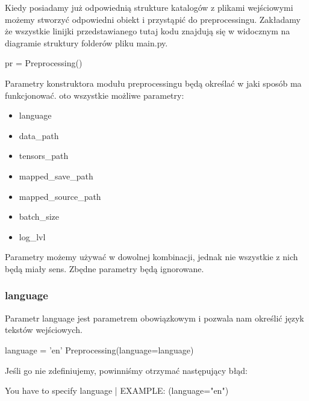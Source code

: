 \myspace
{}
\myspace

Kiedy posiadamy już odpowiednią strukture katalogów z plikami wejściowymi możemy stworzyć 
odpowiedni obiekt i przystąpić do preprocessingu. Zakładamy że wszystkie linijki przedstawianego 
tutaj kodu znajdują się w widocznym na diagramie struktury folderów pliku main.py.

\begin{python}
pr = Preprocessing()

\end{python}

Parametry konstruktora modułu preprocessingu będą określać w jaki sposób ma funkcjonować. 
oto wszystkie możliwe parametry:
\begin{itemize}
	\item language
	\item data\_path
	\item tensors\_path
	\item mapped\_save\_path
	\item mapped\_source\_path
	\item batch\_size
	\item log\_lvl
\end{itemize}

Parametry możemy używać w dowolnej kombinacji, jednak nie wszystkie z nich będą miały sens. Zbędne
parametry będą ignorowane.

\subsubsection{language}
Parametr language jest parametrem obowiązkowym i pozwala nam określić język tekstów wejściowych.
\begin{python}
language = 'en'
Preprocessing(language=language)

\end{python}

Jeśli go nie zdefiniujemy, powinniśmy otrzymać następujący błąd:

\begin{consolerror}
You have to specify language | EXAMPLE: (language="en")
\end{consolerror}

